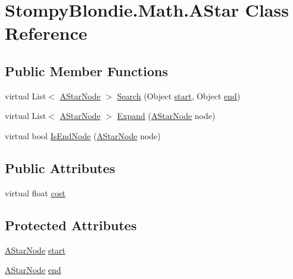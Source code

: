 \hypertarget{class_stompy_blondie_1_1_math_1_1_a_star}{}\section{Stompy\+Blondie.\+Math.\+A\+Star Class Reference}
\label{class_stompy_blondie_1_1_math_1_1_a_star}
\subsection*{Public Member Functions}
\begin{DoxyCompactItemize}
\item 
virtual List$<$ \mbox{\hyperlink{class_stompy_blondie_1_1_math_1_1_a_star_node}{A\+Star\+Node}} $>$ \mbox{\hyperlink{class_stompy_blondie_1_1_math_1_1_a_star_abba11aaec721f3d70f8998d64ccdb299}{Search}} (Object \mbox{\hyperlink{class_stompy_blondie_1_1_math_1_1_a_star_aa83953b9f5eccd538d5a64c9cb4eb51f}{start}}, Object \mbox{\hyperlink{class_stompy_blondie_1_1_math_1_1_a_star_ab1472040ee08ddfc6f2817198de0ea97}{end}})
\item 
virtual List$<$ \mbox{\hyperlink{class_stompy_blondie_1_1_math_1_1_a_star_node}{A\+Star\+Node}} $>$ \mbox{\hyperlink{class_stompy_blondie_1_1_math_1_1_a_star_a1ab565fca68068ebbf331736a144ead9}{Expand}} (\mbox{\hyperlink{class_stompy_blondie_1_1_math_1_1_a_star_node}{A\+Star\+Node}} node)
\item 
virtual bool \mbox{\hyperlink{class_stompy_blondie_1_1_math_1_1_a_star_a310801f602808b6cf4d7cb468a825442}{Is\+End\+Node}} (\mbox{\hyperlink{class_stompy_blondie_1_1_math_1_1_a_star_node}{A\+Star\+Node}} node)
\end{DoxyCompactItemize}
\subsection*{Public Attributes}
\begin{DoxyCompactItemize}
\item 
virtual float \mbox{\hyperlink{class_stompy_blondie_1_1_math_1_1_a_star_a2e63d84e2680f0047a2beb68b4e19d6e}{cost}}
\end{DoxyCompactItemize}
\subsection*{Protected Attributes}
\begin{DoxyCompactItemize}
\item 
\mbox{\hyperlink{class_stompy_blondie_1_1_math_1_1_a_star_node}{A\+Star\+Node}} \mbox{\hyperlink{class_stompy_blondie_1_1_math_1_1_a_star_aa83953b9f5eccd538d5a64c9cb4eb51f}{start}}
\item 
\mbox{\hyperlink{class_stompy_blondie_1_1_math_1_1_a_star_node}{A\+Star\+Node}} \mbox{\hyperlink{class_stompy_blondie_1_1_math_1_1_a_star_ab1472040ee08ddfc6f2817198de0ea97}{end}}
\end{DoxyCompactItemize}


